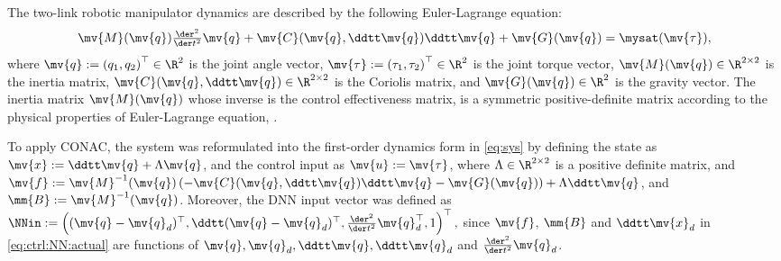 \documentclass[letterpaper, journal, twoside]{IEEEtran}
\begin{document}
The two-link robotic manipulator dynamics are described by the following Euler-Lagrange equation:
\begin{equation} \label{eq:robot:dynamics}
  \mv{M}(\mv{q})\tfrac{\der^2}{\der t^2}{\mv{q}}
  +
  \mv{C}(\mv{q},\ddtt\mv{q})\ddtt\mv{q}
  +
  \mv{G}(\mv{q})
  =
  \mysat
  (
    \mv{\tau}
  )
  ,
\end{equation}
where $\mv{q} := \left(q_1,q_2\right)^\top \in \R^2$ is the joint angle vector, $\mv{\tau} := \left(\tau_1,\tau_2\right)^\top \in \R^2$ is the joint torque vector, $\mv{M}(\mv{q}) \in \R^{2\times2}$ is the inertia matrix, $\mv{C}(\mv{q},\ddtt\mv{q}) \in \R^{2\times2}$ is the Coriolis matrix, and $\mv{G}(\mv{q}) \in \R^2$ is the gravity vector.
The inertia matrix $\mv{M}(\mv{q})$ whose inverse is the control effectiveness matrix, is a symmetric positive-definite matrix according to the physical properties of Euler-Lagrange equation, \cite[Lemma 3.1]{Ji:2025aa}.

To apply CONAC, the system was reformulated into the first-order dynamics form in \eqref{eq:sys} by defining the state as $\mv{x} := \ddtt\mv{q}+\Lambda\mv{q}$, and the control input as $\mv{u} := \mv{\tau}$, where $\Lambda\in\R^{2\times2}$ is a positive definite matrix, and $\mv{f}:=\mv{M}^{-1}(\mv{q})\left(-\mv{C}(\mv{q},\ddtt\mv{q})\ddtt\mv{q}-\mv{G}(\mv{q})\right)+\Lambda\ddtt\mv{q}$, and $\mm{B}:=\mv{M}^{-1}(\mv{q})$.
Moreover, the DNN input vector was defined as 
$
  \NNin 
  := 
  \left(
    (\mv{q}-\mv{q}_d)^\top
    ,
    \ddtt(\mv{q}-\mv{q}_d)^\top
    ,
    \tfrac{\der^2}{\der t^2}\mv{q}_d^\top
    ,
    1
  \right)^\top
  ,
$
since $\mv{f}$, $\mm{B}$ and $\ddtt\mv{x}_d$ in \eqref{eq:ctrl:NN:actual} are functions of $\mv{q},\mv{q}_d,\ddtt\mv{q},\ddtt\mv{q}_d$ and $\tfrac{\der^2}{\der t^2}\mv{q}_d$.
\end{document}
